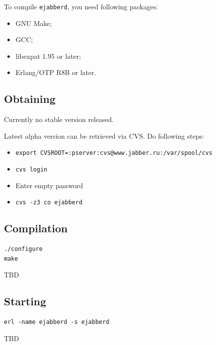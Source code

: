 \documentclass[10pt]{article}
\newcommand{\ejabberd}{\texttt{ejabberd}}
\begin{document}
To compile \ejabberd{}, you need following packages:
\begin{itemize}
\item GNU Make;
\item GCC;
\item libexpat 1.95 or later;
\item Erlang/OTP R8B or later.
\end{itemize}

\subsection{Obtaining}
\label{sec:obtaining}

Currently no stable version released.

Latest alpha version can be retrieved via CVS\@.  Do following steps:
\begin{itemize}
\item \texttt{export CVSROOT=:pserver:cvs@www.jabber.ru:/var/spool/cvs}
\item \texttt{cvs login}
\item Enter empty password
\item \texttt{cvs -z3 co ejabberd}
\end{itemize}






\subsection{Compilation}
\label{sec:compilation}

\begin{verbatim}
./configure
make
\end{verbatim}

TBD





\subsection{Starting}
\label{sec:starting}

\begin{verbatim}
erl -name ejabberd -s ejabberd
\end{verbatim}

TBD
\end{document}
